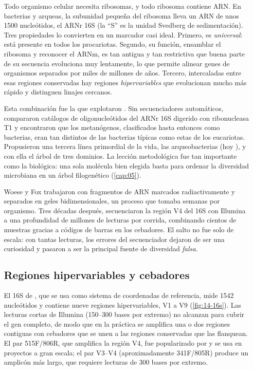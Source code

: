 Todo organismo celular necesita ribosomas, y todo ribosoma contiene ARN. En bacterias y arqueas, la subunidad pequeña del ribosoma lleva un ARN de unos 1500 nucleótidos, el ARNr 16S (la ``S'' es la unidad Svedberg de sedimentación). Tres propiedades lo convierten en un marcador casi ideal. Primero, es \emph{universal}: está presente en todos los procariotas. Segundo, su función, ensamblar el ribosoma y reconocer el ARNm, es tan antigua y tan restrictiva que buena parte de su secuencia evoluciona muy lentamente, lo que permite alinear genes de organismos separados por miles de millones de años. Tercero, intercaladas entre esas regiones conservadas hay regiones \emph{hipervariables} que evolucionan mucho más rápido y distinguen linajes cercanos.

Esta combinación fue la que explotaron \textcite{c14-woese1977}. Sin secuenciadores automáticos, compararon catálogos de oligonucleótidos del ARNr 16S digerido con ribonucleasa T1 y encontraron que los metanógenos, clasificados hasta entonces como bacterias, eran tan distintos de las bacterias típicas como estas de los eucariotas. Propusieron una tercera línea primordial de la vida, las arqueobacterias (hoy ), y con ella el árbol de tres dominios. La lección metodológica fue tan importante como la biológica: una sola molécula bien elegida basta para ordenar la diversidad microbiana en un árbol filogenético (\cref{cap:05}).

\begin{historia}
Woese y Fox trabajaron con fragmentos de ARN marcados radiactivamente y separados en geles bidimensionales, un proceso que tomaba semanas por organismo. Tres décadas después, \textcite{c14-caporaso2011} secuenciaron la región V4 del 16S con Illumina a una profundidad de millones de lecturas por corrida, combinando cientos de muestras gracias a códigos de barras en los cebadores. El salto no fue solo de escala: con tantas lecturas, los errores del secuenciador dejaron de ser una curiosidad y pasaron a ser la principal fuente de diversidad \emph{falsa}.
\end{historia}

\subsection{Regiones hipervariables y cebadores}

El 16S de , que se usa como sistema de coordenadas de referencia, mide \num{1542} nucleótidos y contiene nueve regiones hipervariables, V1 a V9 (\cref{fig:14-16s}). Las lecturas cortas de Illumina (\numrange{150}{300} bases por extremo) no alcanzan para cubrir el gen completo, de modo que en la práctica se amplifica una o dos regiones contiguas con cebadores que se unen a las regiones conservadas que las flanquean. El par 515F/806R, que amplifica la región V4, fue popularizado por \textcite{c14-caporaso2011} y se usa en proyectos a gran escala; el par V3–V4 (aproximadamente 341F/805R) produce un amplicón más largo, que requiere lecturas de 300 bases por extremo.

